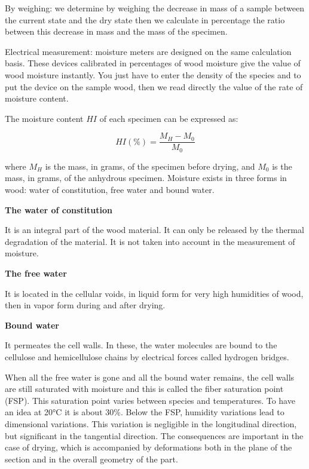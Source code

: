 By weighing: we determine by weighing the decrease in mass of a sample between the current state and the dry state then we calculate in percentage the ratio between this decrease in mass and the mass of the specimen.

Electrical measurement: moisture meters are designed on the same calculation basis. These devices calibrated in percentages of wood moisture give the value of wood moisture instantly. You just have to enter the density of the species and to put the device on the sample wood, then we read directly the value of the rate of moisture content.

The moisture content $HI$ of each specimen can be expressed as:

\begin{equation}
	HI(\%) = \frac{M_{H}-M_{0}}{M_{0}}
	\label{eq:HI}
\end{equation}

where $M_H$ is the mass, in grams, of the specimen before drying, and $M_0$ is the mass, in grams, of the anhydrous specimen. Moisture exists in three forms in wood: water of constitution, free water and bound water.

\smallskip

\textbf{The water of constitution}

It is an integral part of the wood material. It can only be released by the thermal degradation of the material. It is not taken into account in the measurement of moisture.

\smallskip

\textbf{The free water}

It is located in the cellular voids, in liquid form for very high humidities of wood, then in vapor form during and after drying.

\smallskip

\textbf{Bound water}

It permeates the cell walls. In these, the water molecules are bound to the cellulose and hemicellulose chains by electrical forces called hydrogen bridges.

\smallskip

When all the free water is gone and all the bound water remains, the cell walls are still saturated with moisture and this is called the fiber saturation point (FSP). This saturation point varies between species and temperatures. To have an idea at 20°C it is about 30\%. Below the FSP, humidity variations lead to dimensional variations. This variation is negligible in the longitudinal direction, but significant in the tangential direction. The consequences are important in the case of drying, which is accompanied by deformations both in the plane of the section and in the overall geometry of the part.


